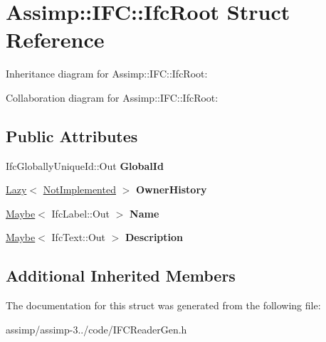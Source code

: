 \hypertarget{struct_assimp_1_1_i_f_c_1_1_ifc_root}{\section{Assimp\+:\+:I\+F\+C\+:\+:Ifc\+Root Struct Reference}
\label{struct_assimp_1_1_i_f_c_1_1_ifc_root}
}


Inheritance diagram for Assimp\+:\+:I\+F\+C\+:\+:Ifc\+Root\+:


Collaboration diagram for Assimp\+:\+:I\+F\+C\+:\+:Ifc\+Root\+:
\subsection*{Public Attributes}
\begin{DoxyCompactItemize}
\item 
\hypertarget{struct_assimp_1_1_i_f_c_1_1_ifc_root_a652cf40216cc056288cf965a02d80a15}{Ifc\+Globally\+Unique\+Id\+::\+Out {\bfseries Global\+Id}}\label{struct_assimp_1_1_i_f_c_1_1_ifc_root_a652cf40216cc056288cf965a02d80a15}

\item 
\hypertarget{struct_assimp_1_1_i_f_c_1_1_ifc_root_a87036d7bcdca98aee0cb73adab37db6f}{\hyperlink{struct_assimp_1_1_s_t_e_p_1_1_lazy}{Lazy}$<$ \hyperlink{struct_assimp_1_1_i_f_c_1_1_not_implemented}{Not\+Implemented} $>$ {\bfseries Owner\+History}}\label{struct_assimp_1_1_i_f_c_1_1_ifc_root_a87036d7bcdca98aee0cb73adab37db6f}

\item 
\hypertarget{struct_assimp_1_1_i_f_c_1_1_ifc_root_a74775c1e946e3152ee829e8c9bffaa50}{\hyperlink{struct_assimp_1_1_s_t_e_p_1_1_maybe}{Maybe}$<$ Ifc\+Label\+::\+Out $>$ {\bfseries Name}}\label{struct_assimp_1_1_i_f_c_1_1_ifc_root_a74775c1e946e3152ee829e8c9bffaa50}

\item 
\hypertarget{struct_assimp_1_1_i_f_c_1_1_ifc_root_ac5a4a26bfe47b05d38ef84b5747acc91}{\hyperlink{struct_assimp_1_1_s_t_e_p_1_1_maybe}{Maybe}$<$ Ifc\+Text\+::\+Out $>$ {\bfseries Description}}\label{struct_assimp_1_1_i_f_c_1_1_ifc_root_ac5a4a26bfe47b05d38ef84b5747acc91}

\end{DoxyCompactItemize}
\subsection*{Additional Inherited Members}


The documentation for this struct was generated from the following file\+:\begin{DoxyCompactItemize}
\item 
assimp/assimp-\/3../code/I\+F\+C\+Reader\+Gen.\+h\end{DoxyCompactItemize}

